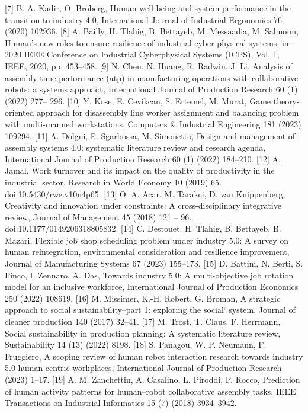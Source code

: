 [7]	B. A. Kadir, O. Broberg, Human well-being and system performance in the transition to industry 4.0, International Journal of Industrial Ergonomics 76 (2020) 102936.
[8]	A. Bailly, H. Tlahig, B. Bettayeb, M. Messaadia, M. Sahnoun, Human’s new roles to ensure resilience of industrial cyber-physical systems, in: 2020 IEEE Conference on Industrial Cyberphysical Systems (ICPS), Vol. 1,
IEEE, 2020, pp. 453–458.
[9]	N. Chen, N. Huang, R. Radwin, J. Li, Analysis of assembly-time performance (atp) in manufacturing operations with collaborative robots: a systems approach, International Journal of Production Research 60 (1) (2022) 277– 296.
[10]	Y. Kose, E. Cevikcan, S. Ertemel, M. Murat, Game theory-oriented approach for disassembly line worker assignment and balancing problem with multi-manned workstations, Computers & Industrial Engineering 181 (2023) 109294.
[11]	A. Dolgui, F. Sgarbossa, M. Simonetto, Design and management of assembly systems 4.0: systematic literature review and research agenda, International Journal of Production Research 60 (1) (2022) 184–210.
[12]	A. Jamal, Work turnover and its impact on the quality of productivity in the industrial sector, Research in World
Economy 10 (2019) 65. doi:10.5430/rwe.v10n4p65.
[13]	O. A. Acar, M. Tarakci, D. van Knippenberg, Creativity and innovation under constraints: A cross-disciplinary integrative review, Journal of Management 45 (2018) 121 – 96. doi:10.1177/0149206318805832.
[14]	C. Destouet, H. Tlahig, B. Bettayeb, B. Mazari, Flexible job shop scheduling problem under industry 5.0: A survey on human reintegration, environmental consideration and resilience improvement, Journal of Manufacturing Systems 67 (2023) 155–173.
[15]	D. Battini, N. Berti, S. Finco, I. Zennaro, A. Das, Towards industry 5.0: A multi-objective job rotation model for an inclusive workforce, International Journal of Production Economics 250 (2022) 108619.
[16]	M. Missimer, K.-H. Robert, G. Broman, A strategic approach to social sustainability–part 1: exploring the social` system, Journal of cleaner production 140 (2017) 32–41.
[17]	M. Trost, T. Claus, F. Herrmann, Social sustainability in production planning: A systematic literature review,
Sustainability 14 (13) (2022) 8198.
[18]	S. Panagou, W. P. Neumann, F. Fruggiero, A scoping review of human robot interaction research towards industry 5.0 human-centric workplaces, International Journal of Production Research (2023) 1–17.
[19]	A. M. Zanchettin, A. Casalino, L. Piroddi, P. Rocco, Prediction of human activity patterns for human–robot collaborative assembly tasks, IEEE Transactions on Industrial Informatics 15 (7) (2018) 3934–3942.
